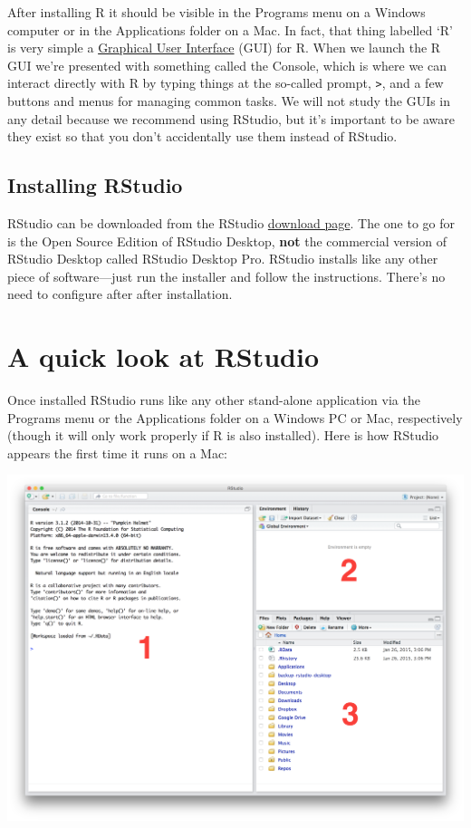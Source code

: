 \documentclass[
]{book}
\begin{document}
After installing R it should be visible in the Programs menu on a Windows computer or in the Applications folder on a Mac. In fact, that thing labelled `R' is very simple a \href{http://en.wikipedia.org/wiki/Graphical_user_interface}{Graphical User Interface} (GUI) for R. When we launch the R GUI we're presented with something called the Console, which is where we can interact directly with R by typing things at the so-called prompt, \texttt{\textgreater{}}, and a few buttons and menus for managing common tasks. We will not study the GUIs in any detail because we recommend using RStudio, but it's important to be aware they exist so that you don't accidentally use them instead of RStudio.

\hypertarget{installing-rstudio}{%
\subsection*{Installing RStudio}\label{installing-rstudio}}

RStudio can be downloaded from the RStudio \href{http://www.rstudio.com/products/RStudio/\#Desk}{download page}. The one to go for is the Open Source Edition of RStudio Desktop, \textbf{not} the commercial version of RStudio Desktop called RStudio Desktop Pro. RStudio installs like any other piece of software---just run the installer and follow the instructions. There's no need to configure after after installation.

\hypertarget{a-quick-look-at-rstudio}{%
\section*{A quick look at RStudio}\label{a-quick-look-at-rstudio}}

Once installed RStudio runs like any other stand-alone application via the Programs menu or the Applications folder on a Windows PC or Mac, respectively (though it will only work properly if R is also installed). Here is how RStudio appears the first time it runs on a Mac:

\includegraphics{images/RStudio-3-pane.png}
\end{document}
